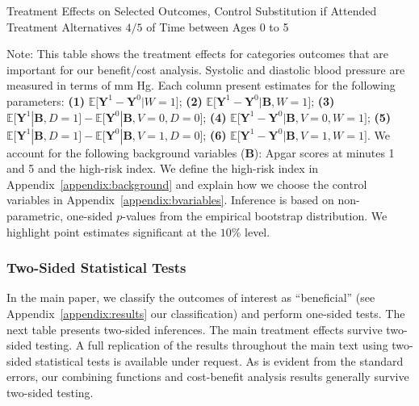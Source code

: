 \begin{table}[!htbp]
\centering
\begin{threeparttable}
\caption{Treatment Effects on Selected Outcomes, Control Substitution if Attended Treatment Alternatives $4/5$ of Time between Ages 0 to 5}\label{table:tescombinedv1}
\begin{scriptsize}

\end{scriptsize}
\begin{tablenotes}
\tiny
Note: This table shows the treatment effects for categories outcomes that are important for our benefit/cost analysis. Systolic and diastolic blood pressure are measured in terms of mm Hg. Each column present estimates for the following parameters: \textbf{(1)} $\mathbb{E} \big[ \bm{Y}^1 - \bm{Y}^0 | W = 1]$; {\textbf{(2)} $\mathbb{E} \big[ \bm{Y}^1 - \bm{Y}^0 | \bm{B}, W=1 \big]$}; {\textbf{(3)} $\mathbb{E} \big[ \bm{Y}^1 | \bm{B}, D=1 \big] - \mathbb{E} \big[ \bm{Y}^0 | \bm{B}, V=0, D=0 \big]$}; {\textbf{(4)} $\mathbb{E} \big[ \bm{Y}^1 - \bm{Y}^0 | \bm{B}, V=0, W = 1 \big] $}; {\textbf{(5)} $\mathbb{E} \big[ \bm{Y}^1 | \bm{B}, D=1 \big] - \mathbb{E} \big[ \bm{Y}^0 | \bm{B}, V=1, D = 0 \big]$}; {\textbf{(6)} $\mathbb{E} \big[ \bm{Y}^1 - \bm{Y}^0 | \bm{B}, V=1 , W = 1\big]$}. We account for the following background variables ($\bm{B}$): Apgar scores at minutes 1 and 5 and the high-risk index. We define the high-risk index in Appendix~\ref{appendix:background} and explain how we choose the control variables in Appendix~\ref{appendix:bvariables}. Inference is based on non-parametric, one-sided $p$-values from the empirical bootstrap distribution. We highlight point estimates significant at the $10\%$ level.
\end{tablenotes}
\end{threeparttable}
\end{table}
\doublespacing

\subsubsection{Two-Sided Statistical Tests}
\label{app:vsensitivity-twosided}

\noindent In the main paper, we classify the outcomes of interest as ``beneficial'' (see Appendix~\ref{appendix:results} our classification) and perform one-sided tests. The next table presents two-sided inferences. The main treatment effects survive two-sided testing. A full replication of the results throughout the main text using two-sided statistical tests is available under request. As is evident from the standard errors, our combining functions and cost-benefit analysis results generally survive two-sided testing.

